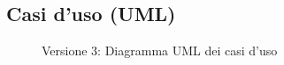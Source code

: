 \begin{landscape}
    \subsection{Casi d'uso (UML)}
    \vfill
    \begin{figure}[H]
        \centering
        \caption{Versione 3: Diagramma UML dei casi d'uso}
        \label{fig:use_case_uml_v3}
    \end{figure}
\end{landscape}